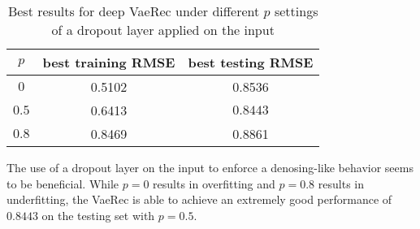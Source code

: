 \begin{table}[H]
\centering
\caption{Best results for deep VaeRec under different $p$ settings of a dropout layer applied on the input}
 \begin{tabular}{|c | c  | c ||} 
 \hline
 $p$ & best training RMSE & best testing RMSE \\ \hline
 $ 0 $ & 0.5102 & 0.8536\\
 $ 0.5 $ & 0.6413 & $\mathbf{0.8443}$ \\
 $ 0.8 $ & 0.8469 & 0.8861
 \\ \hline
\end{tabular}
\end{table}

The use of a dropout layer on the input to enforce a denosing-like behavior
seems to be beneficial. While $p=0$ results in overfitting and $p=0.8$ results in underfitting, the VaeRec is able to achieve an extremely good performance
of $0.8443$ on the testing set with $p=0.5$.
